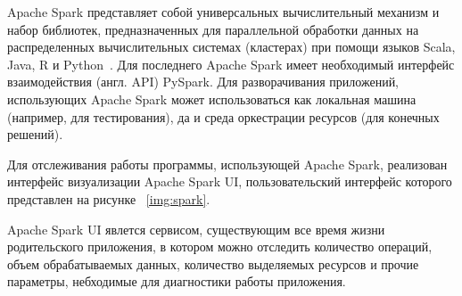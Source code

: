 Apache Spark представляет собой универсальных вычислительный механизм и набор библиотек, предназначенных для параллельной
обработки данных на распределенных вычислительных системах (кластерах) при помощи языков Scala, Java, R и 
Python~\autocite{impl:spark-overview}. Для последнего Apache Spark имеет необходимый интерфейс взаимодействия (англ. API) 
PySpark. Для разворачивания приложений, использующих Apache Spark может использоваться как локальная машина (например, 
для тестирования), да и среда оркестрации ресурсов (для конечных решений).

Для отслеживания работы программы, использующей Apache Spark, реализован интерфейс визуализации  Apache Spark UI, пользовательский
интерфейс которого представлен на рисунке ~\ref{img:spark}.


Apache Spark UI явлется сервисом, существующим все время жизни родительского приложения, в котором можно отследить количество операций,
объем обрабатываемых данных, количество выделяемых ресурсов и прочие параметры, небходимые для диагностики работы приложения.

